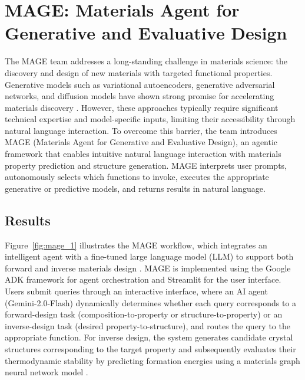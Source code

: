 \section{MAGE: Materials Agent for Generative and Evaluative Design}

%

The MAGE team addresses a long-standing challenge in materials science: the discovery and design of new materials with targeted functional properties. Generative models such as variational autoencoders, generative adversarial networks, and diffusion models have shown strong promise for accelerating materials discovery \cite{park2024has}. However, these approaches typically require significant technical expertise and model-specific inputs, limiting their accessibility through natural language interaction. To overcome this barrier, the team introduces MAGE (Materials Agent for Generative and Evaluative Design), an agentic framework that enables intuitive natural language interaction with materials property prediction and structure generation. MAGE interprets user prompts, autonomously selects which functions to invoke, executes the appropriate generative or predictive models, and returns results in natural language.


\subsection*{Results}

Figure~\ref{fig:mage_1} illustrates the MAGE workflow, which integrates an intelligent agent with a fine-tuned large language model (LLM) to support both forward and inverse materials design \cite{choudhary2024atomgpt}. MAGE is implemented using the Google ADK framework for agent orchestration and Streamlit for the user interface. Users submit queries through an interactive interface, where an AI agent (Gemini-2.0-Flash) dynamically determines whether each query corresponds to a forward-design task (composition-to-property or structure-to-property) or an inverse-design task (desired property-to-structure), and routes the query to the appropriate function. For inverse design, the system generates candidate crystal structures corresponding to the target property and subsequently evaluates their thermodynamic stability by predicting formation energies using a materials graph neural network model \cite{chen2022universal}.

